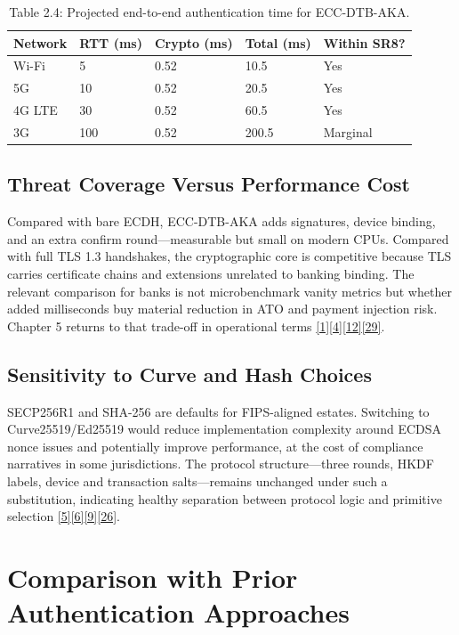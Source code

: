 \begin{table}[htbp]
\centering
\begin{tabular}{lllll}
\toprule
Network & RTT (ms) & Crypto (ms) & Total (ms) & Within SR8? \\
\midrule
Wi-Fi & 5 & 0.52 & 10.5 & Yes \\
5G & 10 & 0.52 & 20.5 & Yes \\
4G LTE & 30 & 0.52 & 60.5 & Yes \\
3G & 100 & 0.52 & 200.5 & Marginal \\
\bottomrule
\end{tabular}
\caption{Table 2.4: Projected end-to-end authentication time for ECC-DTB-AKA.}\label{tbl:2.4}
\end{table}
\subsection{Threat Coverage Versus Performance Cost}

\indent Compared with bare ECDH, ECC-DTB-AKA adds signatures, device binding, and an extra confirm round---measurable but small on modern CPUs. Compared with full TLS 1.3 handshakes, the cryptographic core is competitive because TLS carries certificate chains and extensions unrelated to banking binding. The relevant comparison for banks is not microbenchmark vanity metrics but whether added milliseconds buy material reduction in ATO and payment injection risk. Chapter 5 returns to that trade-off in operational terms \hyperref[ref:1]{[1]}\hyperref[ref:4]{[4]}\hyperref[ref:12]{[12]}\hyperref[ref:29]{[29]}.

\subsection{Sensitivity to Curve and Hash Choices}

\indent SECP256R1 and SHA-256 are defaults for FIPS-aligned estates. Switching to Curve25519/Ed25519 would reduce implementation complexity around ECDSA nonce issues and potentially improve performance, at the cost of compliance narratives in some jurisdictions. The protocol structure---three rounds, HKDF labels, device and transaction salts---remains unchanged under such a substitution, indicating healthy separation between protocol logic and primitive selection \hyperref[ref:5]{[5]}\hyperref[ref:6]{[6]}\hyperref[ref:9]{[9]}\hyperref[ref:26]{[26]}.

\section{Comparison with Prior Authentication Approaches}

